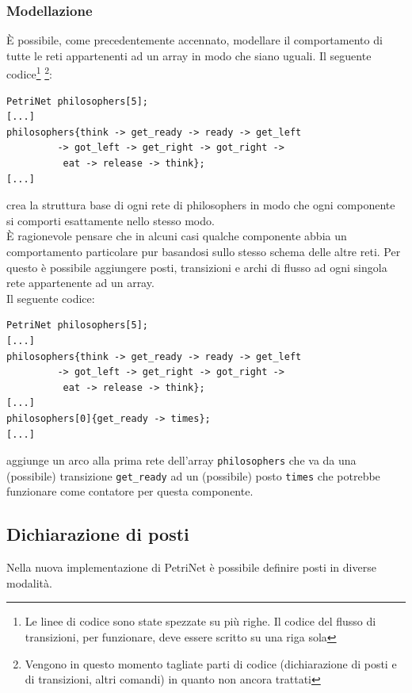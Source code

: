 \documentclass[italian,12pt]{book}
\begin{document}
\subsubsection{Modellazione}
È possibile, come precedentemente accennato, modellare il comportamento di tutte le reti appartenenti ad un 
array in modo che siano uguali. Il seguente codice\footnote{Le linee di codice sono state spezzate su più 
righe. Il codice del flusso di transizioni, per funzionare, deve essere scritto su una riga sola} \footnote{
Vengono in questo momento tagliate parti di codice (dichiarazione di posti e di transizioni, altri comandi) in
quanto non ancora trattati}:
\begin{verbatim}PetriNet philosophers[5];
[...]
philosophers{think -> get_ready -> ready -> get_left 
	     -> got_left -> get_right -> got_right -> 
	      eat -> release -> think};
[...]
\end{verbatim}
crea la struttura base di ogni rete di philosophers in modo che ogni componente si comporti esattamente nello
stesso modo.\\
È ragionevole pensare che in alcuni casi qualche componente abbia un comportamento particolare  pur basandosi 
sullo stesso schema delle altre reti. Per questo è possibile aggiungere posti, transizioni e archi di 
flusso ad ogni singola rete appartenente ad un array.\\
Il seguente codice:
\begin{verbatim}PetriNet philosophers[5];
[...]
philosophers{think -> get_ready -> ready -> get_left 
	     -> got_left -> get_right -> got_right -> 
	      eat -> release -> think};
[...]
philosophers[0]{get_ready -> times};
[...]
\end{verbatim}
aggiunge un arco alla prima rete dell'array {\tt philosophers} che va da una (possibile) transizione 
{\tt get\_ready}
ad un (possibile) posto {\tt times} che potrebbe funzionare come contatore per questa componente.

\subsection{Dichiarazione di posti}\label{ssect:nuovi_posti}
Nella nuova implementazione di PetriNet è possibile definire posti in diverse modalità.\\
\end{document}
